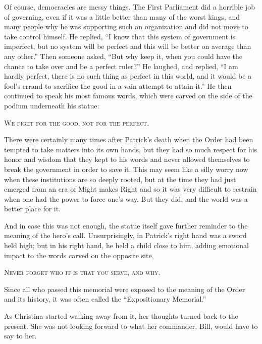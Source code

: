 \documentclass[showtrims,b6paper,draft,10pt]{memoir}
\begin{document}
Of course, democracies are messy things.  The First Parliament did a horrible job of governing, even if it was a little better than many of the worst kings, and many people why he was supporting such an organization and did not move to take control himself.  He replied, ``I know that this system of government is imperfect, but no system will be perfect and this will be better on average than any other.''  Then someone asked, ``But why keep it, when you could have the chance to take over and be a perfect ruler?''  He laughed, and replied, ``I am hardly perfect, there is no such thing as perfect in this world, and it would be a fool's errand to sacrifice the good in a vain attempt to attain it.''  He then continued to speak his most famous words, which were carved on the side of the podium underneath his statue:

\begin{center}
\textsc{We fight for the good, not for the perfect.}
\end{center}

There were certainly many times after Patrick's death when the Order had been tempted to take matters into its own hands, but they had so much respect for his honor and wisdom that they kept to his words and never allowed themselves to break the government in order to save it.  This may seem like a silly worry now when these institutions are so deeply rooted, but at the time they had just emerged from an era of Might makes Right and so it was very difficult to restrain when one had the power to force one's way.  But they did, and the world was a better place for it.

And in case this was not enough, the statue itself gave further reminder to the meaning of the hero's call.  Unsurprisingly, in Patrick's right hand was a sword held high;  but in his right hand, he held a child close to him, adding emotional impact to the words carved on the opposite site,

\begin{center}
\textsc{Never forget who it is that you serve, and why.}
\end{center}

Since all who passed this memorial were exposed to the meaning of the Order and its history, it was often called the ``Expositionary Memorial.''

As Christina started walking away from it, her thoughts turned back to the present.  She was not looking forward to what her commander, Bill, would have to say to her.
\end{document}
